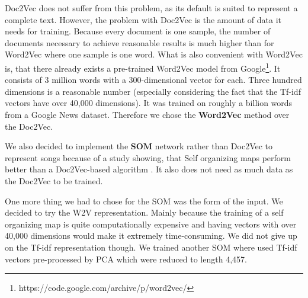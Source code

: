 Doc2Vec does not suffer from this problem, as its default is suited to represent a complete text. However, the problem with Doc2Vec is the amount of data it needs for training. Because every document is one sample, the number of documents necessary to achieve reasonable results is much higher than for Word2Vec where one sample is one word. What is also convenient with Word2Vec is, that there already exists a pre-trained Word2Vec model from Google\footnote{https://code.google.com/archive/p/word2vec/}. It consists of 3 million words with a 300-dimensional vector for each. Three hundred dimensions is a reasonable number (especially considering the fact that the Tf-idf vectors have over 40,000 dimensions). It was trained on roughly a billion words from a Google News dataset. Therefore we chose the \textbf{Word2Vec} method over the Doc2Vec.  

We also decided to implement the \textbf{SOM} network rather than Doc2Vec to represent songs because of a study showing, that Self organizing maps perform better than a Doc2Vec-based algorithm \cite{inproceedings}. It also does not need as much data as the Doc2Vec to be trained. 

One more thing we had to chose for the SOM was the form of the input. We decided to try the W2V representation. Mainly because the training of a self organizing map is quite computationally expensive and having vectors with over 40,000 dimensions would make it extremely time-consuming. We did not give up on the Tf-idf representation though. We trained another SOM where used Tf-idf vectors pre-processed by PCA which were reduced to length 4,457. 

